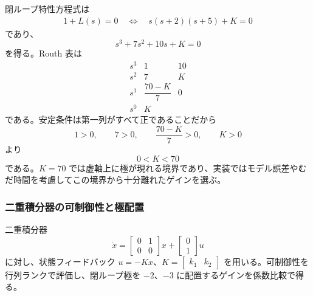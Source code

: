 \begin{derivation}
閉ループ特性方程式は
\begin{align}
  1+L(s)=0
  \quad\Longleftrightarrow\quad
  s(s+2)(s+5)+K=0
\end{align}
であり、
\begin{equation}
  s^3+7s^2+10s+K=0
\end{equation}
を得る。Routh 表は
\begin{equation}
\begin{array}{c|cc}
  s^3 & 1 & 10\\
  s^2 & 7 & K\\
  s^1 & \dfrac{70-K}{7} & 0\\
  s^0 & K &
\end{array}
\end{equation}
である。安定条件は第一列がすべて正であることだから
\begin{equation}
  1>0,\qquad 7>0,\qquad \frac{70-K}{7}>0,\qquad K>0
\end{equation}
より
\begin{equation}
  0<K<70
\end{equation}
である。$K=70$ では虚軸上に極が現れる境界であり、実装ではモデル誤差やむだ時間を考慮してこの境界から十分離れたゲインを選ぶ。
\end{derivation}

\subsubsection{二重積分器の可制御性と極配置}

二重積分器
\begin{equation}
  \dot{x}=
  \begin{bmatrix}
    0&1\\0&0
  \end{bmatrix}x+
  \begin{bmatrix}
    0\\1
  \end{bmatrix}u
\end{equation}
に対し、状態フィードバック $u=-Kx$、$K=\begin{bmatrix}k_1&k_2\end{bmatrix}$ を用いる。可制御性を行列ランクで評価し、閉ループ極を $-2$、$-3$ に配置するゲインを係数比較で得る。

